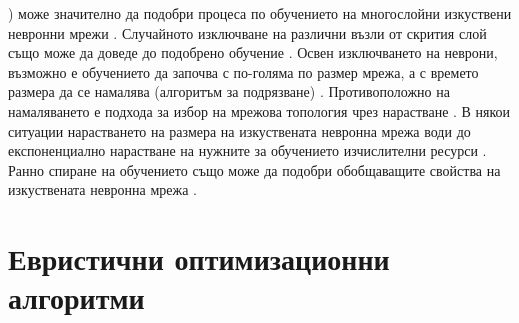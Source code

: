 \cite{Zur-01}) може значително да подобри процеса по обучението на многослойни изкуствени невронни мрежи \cite{Sietsma-01}. Случайното изключване на различни възли от скрития слой също може да доведе до подобрено обучение \cite{Sequin-01}. Освен изключването на неврони, възможно е обучението да започва с по-голяма по размер мрежа, а с времето размера да се намалява (алгоритъм за подрязване) \cite{Karnin-01}. Противоположно на намаляването е подхода за избор на мрежова топология чрез нарастване \cite{Yao-01}. В някои ситуации нарастването на размера на изкуствената невронна мрежа води до експоненциално нарастване на нужните за обучението изчислителни ресурси \cite{Wilamowski-01}. Ранно спиране на обучението също може да подобри обобщаващите свойства на изкуствената невронна мрежа \cite{Coulibaly-01}.

\section{Евристични оптимизационни алгоритми}

